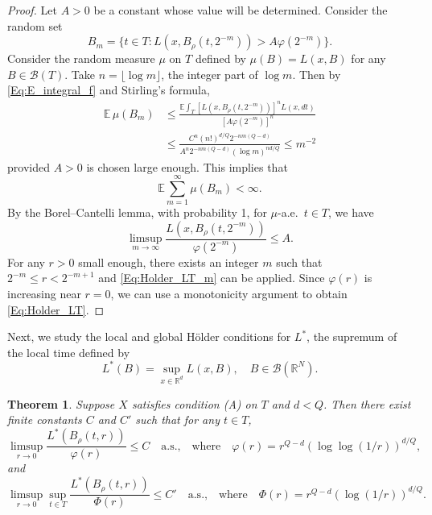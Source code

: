 \documentclass[11pt, reqno]{amsart}
\newtheorem{theorem}{Theorem}[section]
\def\R{{\mathbb R}}
\def\E{{\mathbb E}}
\numberwithin{equation}{section}
\begin{document}
\begin{proof}
Let $A > 0$ be a constant whose value will be determined. Consider the random set
\[ B_m = \{ t \in T : L(x, B_\rho(t, 2^{-m})) > A \varphi(2^{-m}) \}. \]
Consider the random measure $\mu$ on $T$ defined by 
$\mu(B) = L(x, B)$ for any $B \in \mathscr{B}(T)$.
Take $n = \lfloor \log m \rfloor$, the integer part of $\log m$.
Then by \eqref{Eq:E_integral_f} and Stirling's formula,
\begin{align*}
\E\,\mu(B_m) &\le \frac{\E\int_T [L(x, B_\rho(t, 2^{-m}))]^n L(x, dt)}{[A\varphi(2^{-m})]^n}\\
& \le \frac{C^n(n!)^{d/Q}2^{-nm(Q-d)}}{A^n 2^{-nm(Q-d)}(\log m)^{nd/Q}} \le m^{-2}
\end{align*}
provided $A > 0$ is chosen large enough. This implies that
\[ \E \sum_{m=1}^\infty \mu(B_m) < \infty. \]
By the Borel--Cantelli lemma, with probability 1, for $\mu$-a.e.~$t \in T$, we have
\begin{equation}\label{Eq:Holder_LT_m}
\limsup_{m \to \infty} \frac{L(x, B_\rho(t, 2^{-m}))}{\varphi(2^{-m})} \le A.
\end{equation}
For any $r > 0$ small enough, there exists an integer $m$ such that $2^{-m} \le r < 2^{-m+1}$ and 
\eqref{Eq:Holder_LT_m}  can be applied. Since $\varphi(r)$ is increasing near $r = 0$, we can use 
a monotonicity argument to obtain \eqref{Eq:Holder_LT}.
\end{proof}

Next, we study the local and global H\"older conditions for $L^*$, the supremum of the local time 
defined by
\[ L^*(B) = \sup_{x \in \R^d} L(x, B), \quad B \in \mathscr{B}(\R^N). \]

\begin{theorem}\label{Th:Holder}
Suppose $X$ satisfies condition \textup{(A)} on $T$ and $d < Q$. %
Then there exist finite constants $C$ and $C'$ such that for any $t \in T$,
\begin{equation}\label{Eq:Holder1}
  \limsup_{r \to 0}  \frac{L^*(B_\rho(t, r))}{\varphi(r)} \le C \quad \text{a.s.,} \quad \text{where} \quad \varphi(r) = r^{Q-d}(\log\log(1/r))^{d/Q},
\end{equation}
and 
\begin{equation}\label{Eq:Holder2}
\limsup_{r \to 0} \sup_{t \in T} \frac{L^*(B_\rho(t, r))}{\Phi(r)} \le C' \quad \text{a.s.,} \quad \text{where} \quad \Phi(r) = r^{Q-d}(\log(1/r))^{d/Q}.
\end{equation}
\end{theorem}
\end{document}
